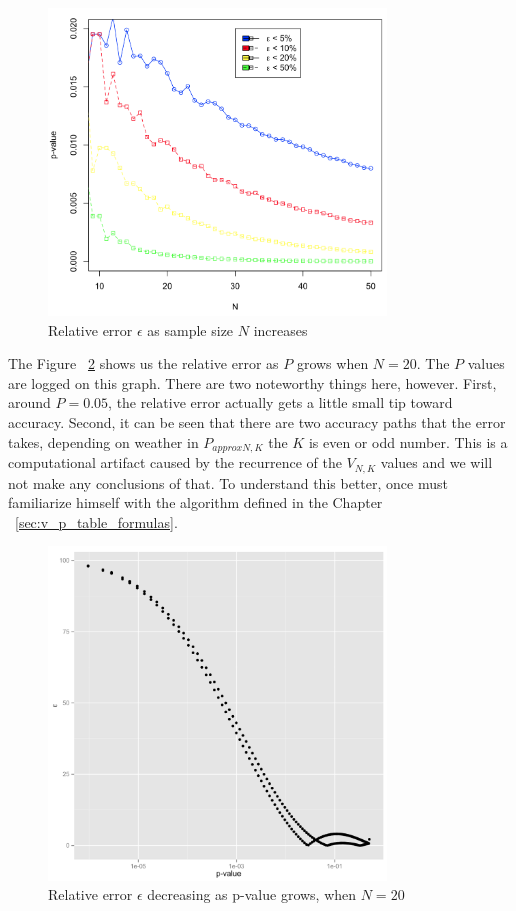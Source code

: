 \documentclass[12pt]{article}
\begin{document}
{\begin{figure}[H]
  \centering
  \includegraphics[width=0.8\textwidth]{PvsN}
  \caption{Relative error $\epsilon$ as sample size $N$ increases}
  \label{fig:PvsN}
\end{figure}

The Figure ~\ref{fig:RelativeErrorDecresingPgrows} shows us the relative error as $P$ grows when $N = 20$. The $P$ values are logged on this graph. There are two noteworthy things here, however. First, around $P = 0.05$, the relative error actually gets a little small tip toward accuracy. Second, it can be seen that there are two accuracy paths that the error takes, depending on weather in $P_{approx N, K}$  the $K$ is even or odd number. This is a computational artifact caused by the recurrence of the $V_{N, K}$ values and we will not make any conclusions of that. To understand this better, once must familiarize himself with the algorithm defined in the Chapter ~\ref{sec:v_p_table_formulas}.


\begin{figure}[H]
	\centering
  \includegraphics[width=0.8\textwidth]{RelativeErrorDecreasingPgrowsN20}
	\caption{Relative error $\epsilon$ decreasing as p-value grows, when $N=20$}
	\label{fig:RelativeErrorDecresingPgrows}
\end{figure}

}
\end{document}
